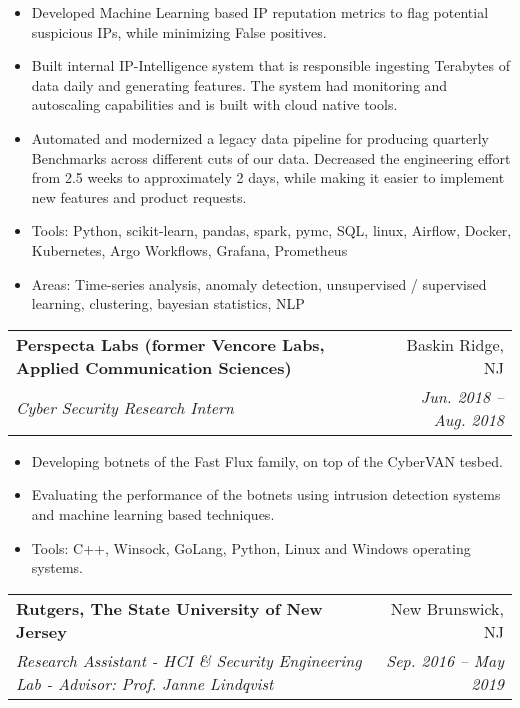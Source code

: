 \documentclass[letterpaper,10pt]{article}
\makeatletter
\newcommand{\resumeSubheading}[4]{
  \vspace{-1pt}\item
    \begin{tabular*}{0.97\textwidth}{l@{\extracolsep{\fill}}r}
      \textbf{#1} & #2 \\
      \textit{\small#3} & \textit{\small #4} \\
    \end{tabular*}\vspace{-5pt}
}
\makeatother
\begin{document}
\begin{itemize}
  \item Developed Machine Learning based IP reputation metrics to flag potential suspicious IPs, while minimizing False positives. 
  \item Built internal IP-Intelligence system that is responsible ingesting Terabytes of data daily and generating features. The system 
  had monitoring and autoscaling capabilities and is built with cloud native tools.
  \item Automated and modernized a legacy data pipeline for producing quarterly Benchmarks across different cuts of our data. 
  Decreased the engineering effort from 2.5 weeks to approximately 2 days, while making it easier to implement new features and product requests.
  \item{Tools: } {Python, scikit-learn, pandas, spark, pymc, SQL, linux, Airflow, Docker, Kubernetes, Argo Workflows, Grafana, Prometheus}
  \item{Areas: } {Time-series analysis, anomaly detection, unsupervised / supervised learning, clustering, bayesian statistics, NLP}
\end{itemize}
\resumeSubheading
{Perspecta Labs (former Vencore Labs, Applied Communication Sciences)}{Baskin Ridge, NJ}
{Cyber Security Research Intern}{Jun. 2018 -- Aug. 2018}
\begin{itemize}
  \item Developing botnets of the Fast Flux family, on top of the CyberVAN tesbed.
  \item Evaluating the performance of the botnets using intrusion detection systems and machine learning based techniques.
  \item{Tools: }{C++, Winsock, GoLang, Python, Linux and Windows operating systems.}
\end{itemize}
\resumeSubheading
{Rutgers, The State University of New Jersey}{New Brunswick, NJ}
{Research Assistant - HCI \& Security Engineering Lab - Advisor: Prof. Janne Lindqvist}{Sep. 2016 -- May 2019}
\end{document}

